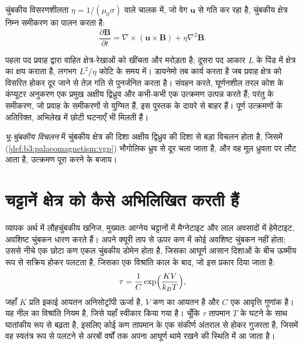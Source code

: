 \begin{proposition}[प्रेरण समीकरण]\label{prop:b3:palaeomagnetism:induction}
चुंबकीय विसरणशीलता $\eta = 1/(\mu_0\sigma)$ वाले चालक में, जो
वेग $\mathbf u$ से गति कर रहा है, चुंबकीय क्षेत्र निम्न समीकरण का पालन करता है:
\[
  \frac{\partial\mathbf B}{\partial t} = \nabla\times(\mathbf u\times\mathbf B)
  + \eta\nabla^2\mathbf B .
\]
\end{proposition}
\admitted

पहला पद प्रवाह द्वारा वाहित क्षेत्र-रेखाओं को खींचता और मरोड़ता है; दूसरा
पद आकार $L$ के पिंड में क्षेत्र का क्षय कराता है, लगभग
$L^2/\eta$ कोटि के समय में। डायनेमो तब कार्य करता है जब प्रवाह क्षेत्र को
विसरित होकर दूर जाने से तेज़ गति से पुनर्जनित करता है। संवहन करते, घूर्णनशील तरल कोश के कंप्यूटर अनुकरण
एक प्रमुख अक्षीय द्विध्रुव और कभी-कभी एक उत्क्रमण उत्पन्न करते हैं; परंतु  के समीकरण,
जो प्रवाह के समीकरणों से युग्मित हैं, इस पुस्तक के दायरे से बाहर हैं।
पूर्ण उत्क्रमणों के अतिरिक्त, अभिलेख में छोटी घटनाएँ भी मिलती हैं।

\begin{definition}[भू-चुंबकीय विचलन]\label{def:b3:palaeomagnetism:excursion}
\emph{भू-चुंबकीय विचलन} में चुंबकीय क्षेत्र की दिशा
अक्षीय द्विध्रुव की दिशा से बड़ा विचलन होता है, जिसमें
 (\cref{def:b3:palaeomagnetism:vgp}) भौगोलिक ध्रुव से दूर चला जाता है,
और वह मूल ध्रुवता पर लौट आता है,
उत्क्रमण पूरा करने के बजाय।
\end{definition}

\section{चट्टानें क्षेत्र को कैसे अभिलिखित करती हैं}

व्यापक अर्थ में लौहचुंबकीय खनिज, मुख्यतः आग्नेय चट्टानों में मैग्नेटाइट और
लाल अवसादों में हेमेटाइट, अवशिष्ट चुंबकन धारण करते हैं। अपने क्यूरी ताप से ऊपर
कण में कोई अवशिष्ट चुंबकन नहीं होता; उससे नीचे एक छोटा कण एकल चुंबकीय डोमेन होता है, जिसका आघूर्ण
आसान दिशाओं के बीच ऊष्मीय रूप से सक्रिय होकर पलटता है, जिसका
एक विश्रांति काल के बाद, जो इस प्रकार दिया जाता है:
\[
  \tau = \frac1C\exp\Bigl(\frac{K V}{k_B T}\Bigr),
\]
जहाँ $K$ प्रति इकाई आयतन अनिसोट्रॉपी ऊर्जा है, $V$ कण का आयतन है और
$C$ एक आवृत्ति गुणांक है। यह नील का विश्रांति नियम है, जिसे यहाँ स्वीकार किया गया है। चूँकि
$\tau$ तापमान $T$ के घटने के साथ घातांकीय रूप से बढ़ता है, इसलिए कोई कण
तापमान के एक संकीर्ण अंतराल से होकर गुजरता है, जिसमें वह स्वतंत्र रूप से पलटने से
अरबों वर्षों तक अपना आघूर्ण थामे रखने की स्थिति में आ जाता है।

